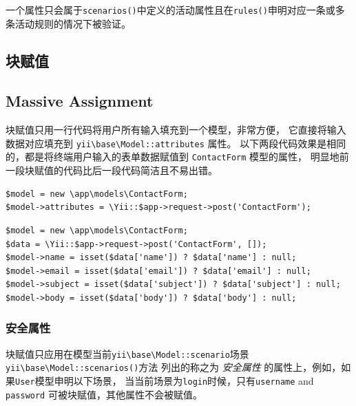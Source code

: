 一个属性只会属于\lstinline|scenarios()|中定义的活动属性且在\lstinline|rules()|申明对应一条或多条活动规则的情况下被验证。

\subsection{块赋值 \label{structure-models.md::massive-assignment}}
\subsection{Massive Assignment \label{structure-models.md::massive-assignment}}
块赋值只用一行代码将用户所有输入填充到一个模型，非常方便，
它直接将输入数据对应填充到 \texttt{yii{\allowbreak{}\textbackslash}base{\allowbreak{}\textbackslash}Model\allowbreak{}::\allowbreak{}attributes} 属性。
以下两段代码效果是相同的，都是将终端用户输入的表单数据赋值到 \lstinline|ContactForm| 模型的属性，
明显地前一段块赋值的代码比后一段代码简洁且不易出错。

\lstset{language=php}\begin{lstlisting}
$model = new \app\models\ContactForm;
$model->attributes = \Yii::$app->request->post('ContactForm');
\end{lstlisting}
\lstset{language=php}\begin{lstlisting}
$model = new \app\models\ContactForm;
$data = \Yii::$app->request->post('ContactForm', []);
$model->name = isset($data['name']) ? $data['name'] : null;
$model->email = isset($data['email']) ? $data['email'] : null;
$model->subject = isset($data['subject']) ? $data['subject'] : null;
$model->body = isset($data['body']) ? $data['body'] : null;
\end{lstlisting}
\subsubsection{安全属性 \label{structure-models.md::safe-attributes}}
块赋值只应用在模型当前\texttt{yii{\allowbreak{}\textbackslash}base{\allowbreak{}\textbackslash}Model\allowbreak{}::\allowbreak{}scenario}场景\texttt{yii{\allowbreak{}\textbackslash}base{\allowbreak{}\textbackslash}Model\allowbreak{}::\allowbreak{}scenarios()}方法
列出的称之为 \textit{安全属性} 的属性上，例如，如果\lstinline|User|模型申明以下场景，
当当前场景为\lstinline|login|时候，只有\lstinline|username| and \lstinline|password| 可被块赋值，其他属性不会被赋值。

